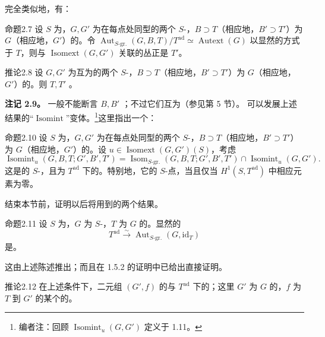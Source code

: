 完全类似地，有：
\begin{SGAresult}{命题}{2.7}
设 $S$ 为，$G,G'$ 为在每点处同型的两个 $S$-，$B\supset T$（相应地，$B'\supset T'$）为 $G$（相应地，$G'$）的。令 $\operatorname{Aut}_{S\text{-gr.}}(G,B,T)/T^{\mathrm{ad}}\simeq\operatorname{Autext}(G)$ 以显然的方式于 $T$，则与 $\operatorname{Isomext}(G,G')$ 关联的丛正是 $T'$。
\end{SGAresult}
\begin{SGAresult}{推论}{2.8}
设 $G,G'$ 为互为的两个 $S$-，$B\supset T$（相应地，$B'\supset T'$）为 $G$（相应地，$G'$）的。则 $T,T'$ 。
\end{SGAresult}
\textbf{注记 2.9。} 一般不能断言 $B,B'$ ；不过它们互为（参见第 5 节）。
可以发展上述结果的“$\operatorname{Isomint}$”变体。\footnote[13]{编者注：回顾 $\operatorname{Isomint}_u(G,G')$ 定义于 1.11。}这里指出一个：
\begin{SGAresult}{命题}{2.10}
设 $S$ 为，$G,G'$ 为在每点处同型的两个 $S$-，$B\supset T$（相应地，$B'\supset T'$）为 $G$（相应地，$G'$）的。设 $u\in\operatorname{Isomext}(G,G')(S)$，考虑
\[\operatorname{Isomint}_u(G,B,T;G',B',T')=\operatorname{Isom}_{S\text{-gr.}}(G,B,T;G',B',T')\cap\operatorname{Isomint}_u(G,G').\]
这是的 $S$-，且为 $T^{\mathrm{ad}}$ 下的。特别地，它的 $S$-点，当且仅当 $H^1(S,T^{\mathrm{ad}})$ 中相应元素为零。
\end{SGAresult}
结束本节前，证明以后将用到的两个结果。
\begin{SGAresult}{命题}{2.11}
设 $S$ 为，$G$ 为 $S$-，$T$ 为 $G$ 的。显然的
\[T^{\mathrm{ad}}\xrightarrow\sim\operatorname{Aut}_{S\text{-gr.}}(G,\mathrm{id}_T)\]
是。
\end{SGAresult}
这由上述陈述推出；而且在 1.5.2 的证明中已给出直接证明。
\begin{SGAresult}{推论}{2.12}
在上述条件下，二元组 $(G',f)$ 的与 $T^{\mathrm{ad}}$ 下的；这里 $G'$ 为 $G$ 的，$f$ 为 $T$ 到 $G'$ 的某个的。
\end{SGAresult}
